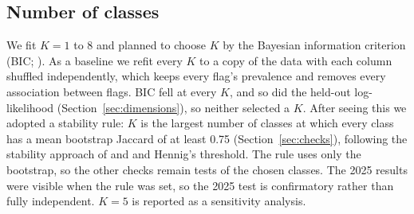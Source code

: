 \subsection{Number of classes}
\label{sec:choosek}
We fit $K=1$ to 8 and planned to choose $K$ by the Bayesian information criterion (BIC; \citealp{nylund2007}). As a baseline we refit every $K$ to a copy of the data with each column shuffled independently, which keeps every flag's prevalence and removes every association between flags. BIC fell at every $K$, and so did the held-out log-likelihood (Section~\ref{sec:dimensions}), so neither selected a $K$. After seeing this we adopted a stability rule: $K$ is the largest number of classes at which every class has a mean bootstrap Jaccard of at least 0.75 (Section~\ref{sec:checks}), following the stability approach of \citet{benhur2002} and \citet{lange2004} and Hennig's \citeyearpar{hennig2007} threshold. The rule uses only the bootstrap, so the other checks remain tests of the chosen classes. The 2025 results were visible when the rule was set, so the 2025 test is confirmatory rather than fully independent. $K=5$ is reported as a sensitivity analysis.


